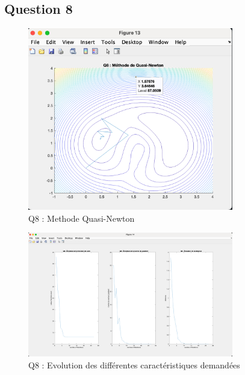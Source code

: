 \documentclass[12pt]{article}
\begin{document}
\subsection{Question 8}
\begin{figure}[H]
    \centering
    \includegraphics[width=0.8\textwidth]{Q8.1.png} 
    \caption{Q8 : Methode Quasi-Newton}
\end{figure}
\begin{figure}[H]
    \centering
    \includegraphics[width=0.8\textwidth]{Q8.2.png} 
    \caption{Q8 : Evolution des différentes caractéristiques demandées}
\end{figure}
\end{document}
